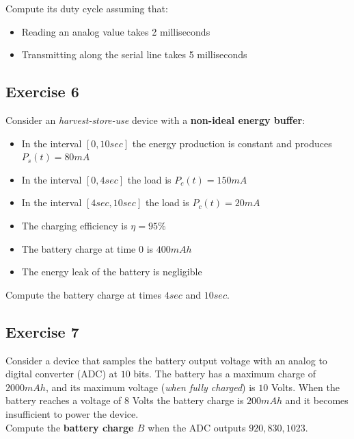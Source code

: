 Compute its duty cycle assuming that:
\begin{itemize}
	\item 
	Reading an analog value takes 2 milliseconds
	\item 
	Transmitting along the serial line takes 5 milliseconds
\end{itemize}

\subsection{Exercise 6}\label{sec:exercise}
Consider an \textit{harvest-store-use} device with a \textbf{non-ideal energy buffer}:
\begin{itemize}
	\item 
	In the interval $[0, 10sec]$ the energy production is constant and produces $P_{s}(t) = 80 mA$
	\item 
	In the interval $[0, 4sec]$ the load is $P_{c}(t) = 150 mA$
	\item 
	In the interval $[4sec, 10sec]$ the load is $P_{c}(t) = 20 mA$
	\item 
	The charging efficiency is $\eta = 95\%$
	\item 
	The battery charge at time $0$ is $400 mAh$
	\item 
	The energy leak of the battery is negligible
	
\end{itemize}
Compute the battery charge at times $4sec$ and $10sec$.


\subsection{Exercise 7}\label{sec:exercise}
Consider a device that samples the battery output voltage with an analog to digital converter (ADC) at $10$ bits.
The battery has a maximum charge of $2000 mAh$, and its maximum voltage (\textit{when fully charged}) is $10$ Volts.
When the battery reaches a voltage of $8$ Volts the battery charge is $200mAh$ and it becomes insufficient to power the device.\\
Compute the \textbf{battery charge $B$} when the ADC outputs $920, 830, 1023$.
